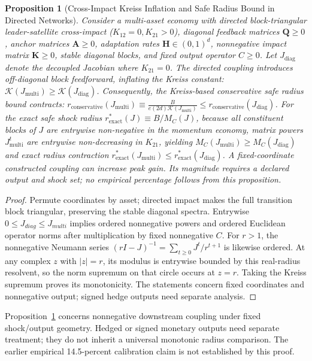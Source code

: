 \documentclass[12pt]{article}
\newtheorem{proposition}[theorem]{Proposition}
\theoremstyle{definition}
\theoremstyle{remark}
\begin{document}
\begin{proposition}[Cross-Impact Kreiss Inflation and Safe Radius Bound in Directed Networks]
\label{prop:cross_kreiss}
Consider a multi-asset economy with directed block-triangular leader-satellite cross-impact ($K_{12} = 0, K_{21} > 0$), diagonal feedback matrices $\mathbf{Q} \ge 0$, anchor matrices $\mathbf{A} \ge 0$, adaptation rates $\mathbf{H} \in (0, 1)^d$, nonnegative impact matrix $\mathbf K\ge0$, stable diagonal blocks, and fixed output operator $C\ge0$. Let $J_{\text{diag}}$ denote the decoupled Jacobian where $K_{21} = 0$.
The directed coupling introduces off-diagonal block feedforward, inflating the Kreiss constant: $\mathcal{K}(J_{\text{multi}}) \ge \mathcal{K}(J_{\text{diag}})$. Consequently, the Kreiss-based conservative safe radius bound contracts: $r_{\text{conservative}}(J_{\text{multi}}) \equiv \frac{B}{e (2d) \mathcal{K}(J_{\text{multi}})} \le r_{\text{conservative}}(J_{\text{diag}})$.
For the exact safe shock radius $r^*_{\text{exact}}(J) \equiv B / M_C(J)$, because all constituent blocks of $J$ are entrywise non-negative in the momentum economy, matrix powers $J_{\text{multi}}^t$ are entrywise non-decreasing in $K_{21}$, yielding $M_C(J_{\text{multi}}) \ge M_C(J_{\text{diag}})$ and exact radius contraction $r^*_{\text{exact}}(J_{\text{multi}}) \le r^*_{\text{exact}}(J_{\text{diag}})$. A fixed-coordinate constructed coupling can increase peak gain. Its magnitude requires a declared output and shock set; no empirical percentage follows from this proposition.
\end{proposition}
\begin{proof}
Permute coordinates by asset; directed impact makes the full transition block triangular, preserving the stable diagonal spectra. Entrywise $0\le J_{diag}\le J_{multi}$ implies ordered nonnegative powers and ordered Euclidean operator norms after multiplication by fixed nonnegative $C$. For $r>1$, the nonnegative Neumann series $(rI-J)^{-1}=\sum_{t\ge0}J^t/r^{t+1}$ is likewise ordered. At any complex $z$ with $|z|=r$, its modulus is entrywise bounded by this real-radius resolvent, so the norm supremum on that circle occurs at $z=r$. Taking the Kreiss supremum proves its monotonicity. The statements concern fixed coordinates and nonnegative output; signed hedge outputs need separate analysis.
\end{proof}


Proposition~\ref{prop:cross_kreiss} concerns nonnegative downstream coupling under fixed shock/output geometry. Hedged or signed monetary outputs need separate treatment; they do not inherit a universal monotonic radius comparison. The earlier empirical 14.5-percent calibration claim is not established by this proof.
\end{document}
